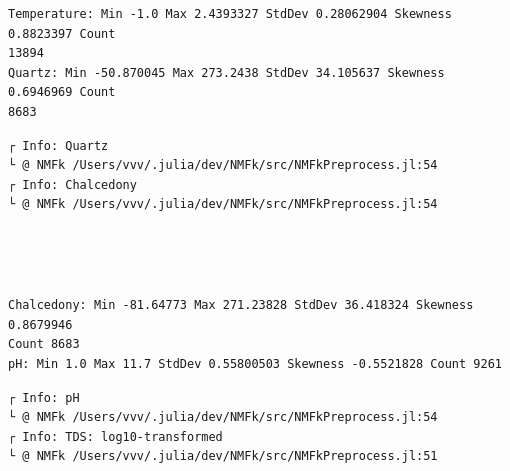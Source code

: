 \documentclass[11pt]{article}
\begin{document}
    \begin{Verbatim}[commandchars=\\\{\}]
Temperature: Min -1.0 Max 2.4393327 StdDev 0.28062904 Skewness 0.8823397 Count
13894
Quartz: Min -50.870045 Max 273.2438 StdDev 34.105637 Skewness 0.6946969 Count
8683
    \end{Verbatim}

    \begin{Verbatim}[commandchars=\\\{\}]
┌ Info: Quartz
└ @ NMFk /Users/vvv/.julia/dev/NMFk/src/NMFkPreprocess.jl:54
┌ Info: Chalcedony
└ @ NMFk /Users/vvv/.julia/dev/NMFk/src/NMFkPreprocess.jl:54
    \end{Verbatim}

    \begin{center}
    \end{center}
    { \hspace*{\fill} \\}
    
    \begin{center}
    \end{center}
    { \hspace*{\fill} \\}
    
    \begin{Verbatim}[commandchars=\\\{\}]
Chalcedony: Min -81.64773 Max 271.23828 StdDev 36.418324 Skewness 0.8679946
Count 8683
pH: Min 1.0 Max 11.7 StdDev 0.55800503 Skewness -0.5521828 Count 9261
    \end{Verbatim}

    \begin{Verbatim}[commandchars=\\\{\}]
┌ Info: pH
└ @ NMFk /Users/vvv/.julia/dev/NMFk/src/NMFkPreprocess.jl:54
┌ Info: TDS: log10-transformed
└ @ NMFk /Users/vvv/.julia/dev/NMFk/src/NMFkPreprocess.jl:51
    \end{Verbatim}

    \begin{center}
    \end{center}
    { \hspace*{\fill} \\}
    
\end{document}
